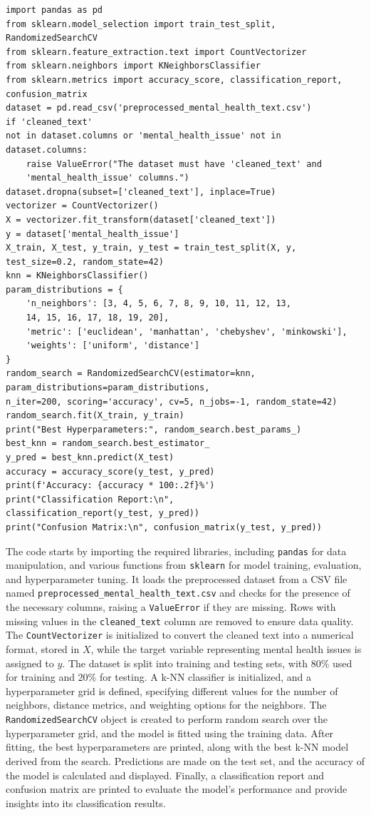 \begin{verbatim}
import pandas as pd
from sklearn.model_selection import train_test_split, 
RandomizedSearchCV
from sklearn.feature_extraction.text import CountVectorizer
from sklearn.neighbors import KNeighborsClassifier
from sklearn.metrics import accuracy_score, classification_report, 
confusion_matrix
dataset = pd.read_csv('preprocessed_mental_health_text.csv')
if 'cleaned_text' 
not in dataset.columns or 'mental_health_issue' not in dataset.columns:
    raise ValueError("The dataset must have 'cleaned_text' and 
    'mental_health_issue' columns.")
dataset.dropna(subset=['cleaned_text'], inplace=True)
vectorizer = CountVectorizer()
X = vectorizer.fit_transform(dataset['cleaned_text'])
y = dataset['mental_health_issue']
X_train, X_test, y_train, y_test = train_test_split(X, y, 
test_size=0.2, random_state=42)
knn = KNeighborsClassifier()
param_distributions = {
    'n_neighbors': [3, 4, 5, 6, 7, 8, 9, 10, 11, 12, 13, 
    14, 15, 16, 17, 18, 19, 20],
    'metric': ['euclidean', 'manhattan', 'chebyshev', 'minkowski'],
    'weights': ['uniform', 'distance']
}
random_search = RandomizedSearchCV(estimator=knn, 
param_distributions=param_distributions, 
n_iter=200, scoring='accuracy', cv=5, n_jobs=-1, random_state=42)
random_search.fit(X_train, y_train)
print("Best Hyperparameters:", random_search.best_params_)
best_knn = random_search.best_estimator_
y_pred = best_knn.predict(X_test)
accuracy = accuracy_score(y_test, y_pred)
print(f'Accuracy: {accuracy * 100:.2f}%')
print("Classification Report:\n", 
classification_report(y_test, y_pred))
print("Confusion Matrix:\n", confusion_matrix(y_test, y_pred))
\end{verbatim}

\noindent
The code starts by importing the required libraries, including \texttt{pandas} for data manipulation, and various functions from \texttt{sklearn} for model training, evaluation, and hyperparameter tuning. It loads the preprocessed dataset from a CSV file named \newline \texttt{preprocessed\_mental\_health\_text.csv} and checks for the presence of the necessary columns, raising a \texttt{ValueError} if they are missing. Rows with missing values in the \texttt{cleaned\_text} column are removed to ensure data quality. The \texttt{CountVectorizer} is initialized to convert the cleaned text into a numerical format, stored in \(X\), while the target variable representing mental health issues is assigned to \(y\). The dataset is split into training and testing sets, with 80\% used for training and 20\% for testing. A k-NN classifier is initialized, and a hyperparameter grid is defined, specifying different values for the number of neighbors, distance metrics, and weighting options for the neighbors. The \texttt{RandomizedSearchCV} object is created to perform random search over the hyperparameter grid, and the model is fitted using the training data. After fitting, the best hyperparameters are printed, along with the best k-NN model derived from the search. Predictions are made on the test set, and the accuracy of the model is calculated and displayed. Finally, a classification report and confusion matrix are printed to evaluate the model's performance and provide insights into its classification results.


